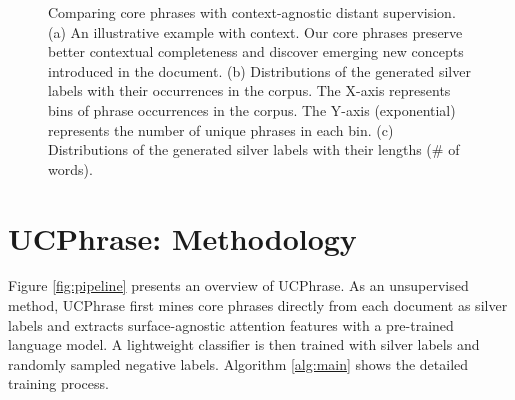 \documentclass[sigconf]{acmart}
\newcommand{\our}{\mbox{UCPhrase}\xspace}
\begin{document}
 \begin{figure*}[t]
    \centering
    \vspace{-2mm}
    \caption{
    Comparing core phrases with context-agnostic distant supervision.
    (a) An illustrative example with context.
    Our core phrases preserve better contextual completeness and discover emerging new concepts introduced in the document.
    (b) Distributions of the generated silver labels with their occurrences in the corpus.
    The X-axis represents bins of phrase occurrences in the corpus. The Y-axis (exponential) represents the number of unique phrases in each bin. 
    (c) Distributions of the generated silver labels with their lengths (\# of words).
    }
    \label{fig:supervision}
    \vspace{-2.2mm}
\end{figure*}


\section{\our: Methodology}
\label{sec:method}

Figure \ref{fig:pipeline} presents an overview of \our.
As an unsupervised method, \our first mines core phrases directly from each document as silver labels and extracts surface-agnostic attention features with a pre-trained language model.
A lightweight classifier is then trained with silver labels and randomly sampled negative labels.
Algorithm \ref{alg:main} shows the detailed training process.
\end{document}

